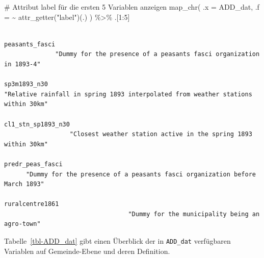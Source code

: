 \documentclass[
  a4paper,
  DIV=11,
  oneside]{scrreprt}
\newenvironment{Shaded}{\begin{snugshade}}{\end{snugshade}}
\newcommand{\AttributeTok}[1]{\textcolor[rgb]{0.40,0.45,0.13}{#1}}
\newcommand{\CommentTok}[1]{\textcolor[rgb]{0.37,0.37,0.37}{#1}}
\newcommand{\DecValTok}[1]{\textcolor[rgb]{0.68,0.00,0.00}{#1}}
\newcommand{\FunctionTok}[1]{\textcolor[rgb]{0.28,0.35,0.67}{#1}}
\newcommand{\NormalTok}[1]{\textcolor[rgb]{0.00,0.23,0.31}{#1}}
\newcommand{\SpecialCharTok}[1]{\textcolor[rgb]{0.37,0.37,0.37}{#1}}
\newcommand{\StringTok}[1]{\textcolor[rgb]{0.13,0.47,0.30}{#1}}
\begin{document}
\begin{Shaded}
\begin{Highlighting}[]
\CommentTok{\# Attribut \textquotesingle{}label\textquotesingle{} für die ersten 5 Variablen anzeigen}
\FunctionTok{map\_chr}\NormalTok{(}
  \AttributeTok{.x =}\NormalTok{ ADD\_dat, }
  \AttributeTok{.f =} \SpecialCharTok{\textasciitilde{}} \FunctionTok{attr\_getter}\NormalTok{(}\StringTok{"label"}\NormalTok{)(.)}
\NormalTok{) }\SpecialCharTok{\%\textgreater{}\%}
\NormalTok{  .[}\DecValTok{1}\SpecialCharTok{:}\DecValTok{5}\NormalTok{]}
\end{Highlighting}
\end{Shaded}

\begin{verbatim}
                                                                   peasants_fasci 
              "Dummy for the presence of a peasants fasci organization in 1893-4" 
                                                                     sp3m1893_n30 
"Relative rainfall in spring 1893 interpolated from weather stations within 30km" 
                                                               cl1_stn_sp1893_n30 
                  "Closest weather station active in the spring 1893 within 30km" 
                                                                 predr_peas_fasci 
      "Dummy for the presence of a peasants fasci organization before March 1893" 
                                                                  ruralcentre1861 
                                  "Dummy for the municipality being an agro-town" 
\end{verbatim}

Tabelle~\ref{tbl-ADD_dat} gibt einen Überblick der in \texttt{ADD\_dat}
verfügbaren Variablen auf Gemeinde-Ebene und deren Definition.

\begingroup
\setlength{}
\setlength{}\fontsize{12.0pt}{14.4pt}\selectfont
\end{document}

